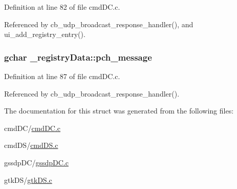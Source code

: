 Definition at line 82 of file cmd\+D\+C.\+c.



Referenced by cb\+\_\+udp\+\_\+broadcast\+\_\+response\+\_\+handler(), and ui\+\_\+add\+\_\+registry\+\_\+entry().

\subsubsection[{\texorpdfstring{pch\+\_\+message}{pch_message}}]{\setlength{\rightskip}{0pt plus 5cm}gchar \+\_\+registry\+Data\+::pch\+\_\+message}\hypertarget{struct__registry_data_aad089cfecaeccff2c9c6bb7a97d46706}{}\label{struct__registry_data_aad089cfecaeccff2c9c6bb7a97d46706}


Definition at line 87 of file cmd\+D\+C.\+c.



Referenced by cb\+\_\+udp\+\_\+broadcast\+\_\+response\+\_\+handler().



The documentation for this struct was generated from the following files\+:\begin{DoxyCompactItemize}
\item 
cmd\+D\+C/\hyperlink{cmd_d_c_8c}{cmd\+D\+C.\+c}\item 
cmd\+D\+S/\hyperlink{cmd_d_s_8c}{cmd\+D\+S.\+c}\item 
gssdp\+D\+C/\hyperlink{gssdp_d_c_8c}{gssdp\+D\+C.\+c}\item 
gtk\+D\+S/\hyperlink{gtk_d_s_8c}{gtk\+D\+S.\+c}\end{DoxyCompactItemize}

